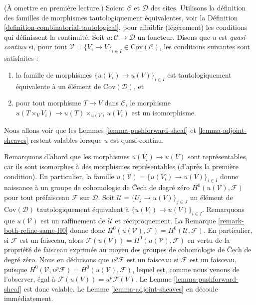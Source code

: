 \begin{remark}
\label{remark-quasi-continuous}
(À omettre en première lecture.)
Soient $\mathcal{C}$ et $\mathcal{D}$ des sites. Utilisons
la définition des familles de morphismes tautologiquement équivalentes,
voir la Définition \ref{definition-combinatorial-tautological},
pour affaiblir (légèrement) les conditions qui définissent la continuité.
Soit $u : \mathcal{C} \to \mathcal{D}$ un foncteur.
Disons que $u$ est {\it quasi-continu} si, pour tout
$\mathcal{V} = \{V_i \to V\}_{i\in I} \in \text{Cov}(\mathcal{C})$,
les conditions suivantes sont satisfaites :
\begin{enumerate}
\item[(1')] la famille de morphismes
$\{u(V_i) \to u(V)\}_{i\in I}$ est tautologiquement équivalente
à un élément de $\text{Cov}(\mathcal{D})$, et
\item[(2)] pour tout morphisme $T \to V$ dans $\mathcal{C}$, le morphisme
$u(T \times_V V_i) \to u(T) \times_{u(V)} u(V_i)$ est un isomorphisme.
\end{enumerate}
Nous allons voir que les Lemmes \ref{lemma-pushforward-sheaf}
et \ref{lemma-adjoint-sheaves} restent valables lorsque
$u$ est quasi-continu.

\medskip\noindent
Remarquons d’abord que les morphismes $u(V_i) \to u(V)$ sont représentables, car
ils sont isomorphes à des morphismes représentables (d’après la première condition).
En particulier, la famille $u(\mathcal{V}) = \{u(V_i) \to u(V)\}_{i\in I}$
donne naissance à un groupe de cohomologie de {\v C}ech de degré zéro
$H^0(u(\mathcal{V}), \mathcal{F})$ pour tout préfaisceau $\mathcal{F}$ sur
$\mathcal{D}$.
Soit $\mathcal{U} = \{U_j \to u(V)\}_{j \in J}$ un élément
de $\text{Cov}(\mathcal{D})$ tautologiquement
équivalent à $\{u(V_i) \to u(V)\}_{i \in I}$. Remarquons que $u(\mathcal{V})$
est un raffinement de $\mathcal{U}$ et réciproquement. La Remarque
\ref{remark-both-refine-same-H0} donne donc
$H^0(u(\mathcal{V}), \mathcal{F}) = H^0(\mathcal{U}, \mathcal{F})$.
En particulier, si $\mathcal{F}$ est un faisceau, alors
$\mathcal{F}(u(V)) = H^0(u(\mathcal{V}), \mathcal{F})$ en vertu de
la propriété de faisceau exprimée au moyen des groupes de cohomologie de
{\v C}ech de degré zéro. Nous en déduisons que $u^p\mathcal{F}$ est un faisceau
si $\mathcal{F}$ est un faisceau, puisque $H^0(\mathcal{V}, u^p\mathcal{F}) =
H^0(u(\mathcal{V}), \mathcal{F})$, lequel est, comme nous venons de l’observer,
égal à $\mathcal{F}(u(V)) = u^p\mathcal{F}(V)$. Le Lemme
\ref{lemma-pushforward-sheaf} est donc valable. Le Lemme
\ref{lemma-adjoint-sheaves} en découle immédiatement.
\end{remark}






